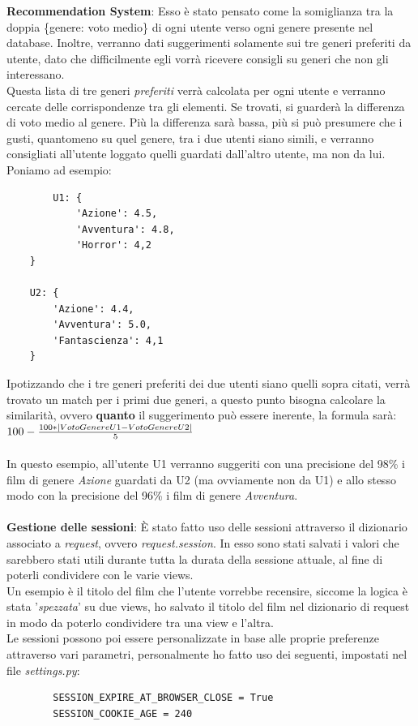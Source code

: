 \documentclass[12pt]{article}
\begin{document}
	
	\noindent \textbf{Recommendation System}: Esso è stato pensato come la somiglianza tra la doppia \{genere: voto medio\} di ogni utente verso ogni genere presente nel database.
	Inoltre, verranno dati suggerimenti solamente sui tre generi preferiti da utente, dato che difficilmente egli vorrà ricevere consigli su generi che non gli interessano. \\Questa lista di tre generi \textit{preferiti} verrà calcolata per ogni utente e verranno cercate delle corrispondenze tra gli elementi. Se trovati, si guarderà la differenza di voto medio al genere. Più la differenza sarà bassa, più si può presumere che i gusti, quantomeno su quel genere, tra i due utenti siano simili, e verranno consigliati all'utente loggato quelli guardati dall'altro utente, ma non da lui. \\
	Poniamo ad esempio:
	\begin{verbatim}
		U1: {
			'Azione': 4.5,
			'Avventura': 4.8,
			'Horror': 4,2
	}

	U2: {
		'Azione': 4.4,
		'Avventura': 5.0,
		'Fantascienza': 4,1
	}
	\end{verbatim}

	\noindent Ipotizzando che i tre generi preferiti dei due utenti siano quelli sopra citati, verrà trovato un match per i primi due generi, a questo punto bisogna calcolare la similarità, ovvero \textbf{quanto} il suggerimento può essere inerente, la formula sarà: \\
	
	$100 - {100 * |VotoGenereU1-VotoGenereU2| \over 5}$ \\ \\
	
	\noindent In questo esempio, all'utente U1 verranno suggeriti con una precisione del 98\% i film di genere \textit{Azione} guardati da U2 (ma ovviamente non da U1) e allo stesso modo con la precisione del 96\% i film di genere \textit{Avventura}. \\ \\
	
	\noindent \textbf{Gestione delle sessioni}: È stato fatto uso delle sessioni attraverso il dizionario associato a \textit{request}, ovvero \textit{request.session}. In esso sono stati salvati i valori che sarebbero stati utili durante tutta la durata della sessione attuale, al fine di poterli condividere con le varie views. \\
	Un esempio è il titolo del film che l'utente vorrebbe recensire, siccome la logica è stata '\textit{spezzata}' su due views, ho salvato il titolo del film nel dizionario di request in modo da poterlo condividere tra una view e l'altra. \\
	Le sessioni possono poi essere personalizzate in base alle proprie preferenze attraverso vari parametri, personalmente ho fatto uso dei seguenti, impostati nel file \textit{settings.py}:
	\begin{verbatim}
		SESSION_EXPIRE_AT_BROWSER_CLOSE = True
		SESSION_COOKIE_AGE = 240
	\end{verbatim}
	
\end{document}
